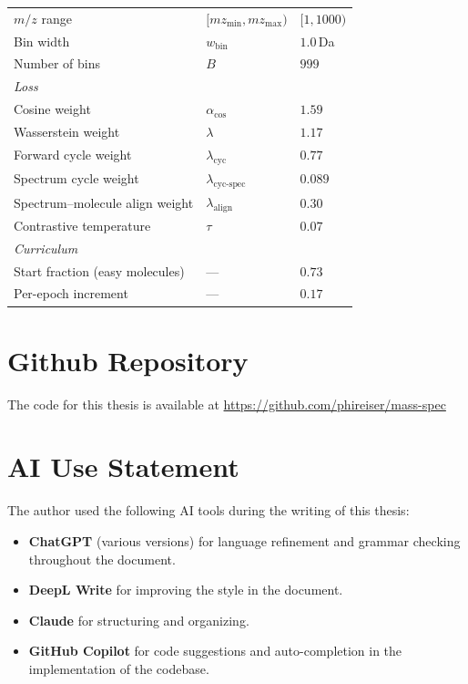 \begin{table}[H]
\begin{tabular}{lll}
        $m/z$ range                       & $[mz_{\min}, mz_{\max})$         & $[1, 1000)$ \\
        Bin width                         & $w_{\mathrm{bin}}$               & $1.0$\,Da \\
        Number of bins                    & $B$                              & $999$ \\
        \hline
        \multicolumn{3}{l}{\emph{Loss}} \\
        Cosine weight                     & $\alpha_{\cos}$                  & $1.59$ \\
        Wasserstein weight                & $\lambda$                        & $1.17$ \\
        Forward cycle weight              & $\lambda_{\mathrm{cyc}}$         & $0.77$ \\
        Spectrum cycle weight             & $\lambda_{\text{cyc-spec}}$      & $0.089$ \\
        Spectrum--molecule align weight   & $\lambda_{\text{align}}$         & $0.30$ \\
        Contrastive temperature           & $\tau$                           & $0.07$ \\
        \hline
        \multicolumn{3}{l}{\emph{Curriculum}} \\
        Start fraction (easy molecules)   & ---                              & $0.73$ \\
        Per-epoch increment               & ---                              & $0.17$ \\
        \hline
    \end{tabular}
\end{table}

\section{Github Repository}
The code for this thesis is available at
\href{https://github.com/phireiser/mass-spec}{https://github.com/phireiser/mass-spec}

\section{AI Use Statement}
The author used the following AI tools during the writing of this thesis:
\begin{itemize}
    \item \textbf{ChatGPT} (various versions) for language refinement and grammar checking throughout the document.
    \item \textbf{DeepL Write} for improving the style in the document.
    \item \textbf{Claude} for structuring and organizing.
    \item \textbf{GitHub Copilot} for code suggestions and auto-completion in the implementation of the codebase.
\end{itemize}
